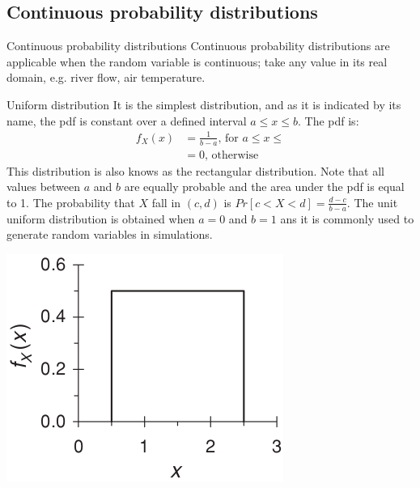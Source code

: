 \documentclass[8pt]{beamer}
\renewcommand{\emph}[1]{\textcolor{myorange}{#1}}
\begin{document}
\subsection{Continuous probability distributions} %
\begin{frame}{Continuous probability distributions}
    \emph{Continuous probability distributions} are applicable when the random variable is continuous; take any value in its real domain, e.g. river flow, air temperature. 
    \begin{block}{\alert{Uniform} distribution}
        It is the simplest distribution, and as it is indicated by its name, the \emph{pdf} is constant over a defined interval $a \leq x \leq b$. The \emph{pdf} is:
         \begin{align*}
             \displaystyle
             f_X (x) &= \frac{1}{b-a} \text{, for } a\leq x \leq \\
                     &= 0 \text{, otherwise}
        \end{align*}
        This distribution is also knows as the \emph{rectangular distribution}. Note that all values between $a$ and $b$ are equally probable and the area under the \emph{pdf} is equal to 1. The probability that $X$ fall in $(c,d)$ is $Pr[c < X < d] = \frac{d-c}{b-a}$. The unit uniform distribution is obtained when $a=0$ and $b=1$ ans it is commonly used to generate random variables in simulations. 
    \end{block}
\begin{minipage}{0.49\textwidth}
\centering
\includegraphics[width=0.8\linewidth]{fi421.png}  %
\end{minipage}
\hfill
\begin{minipage}{0.49\textwidth}

\end{minipage}
\end{frame}
\end{document}
